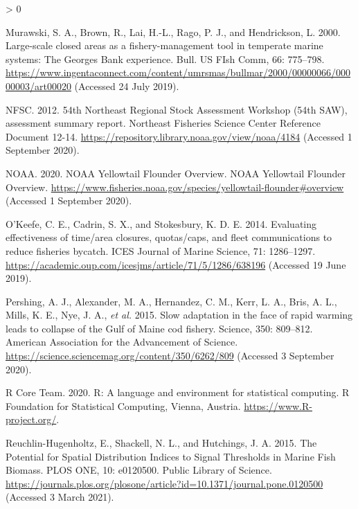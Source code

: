 \documentclass[
]{article}
\newlength{\cslhangindent}
\newenvironment{CSLReferences}[2] %
 {%
  \setlength{\parindent}{0pt}
  \ifodd #1 \everypar{\setlength{\hangindent}{\cslhangindent}}\ignorespaces\fi
  \ifnum #2 > 0
  \setlength{\parskip}{#2\baselineskip}
  \fi
 }%
 {}
\begin{document}
\begin{CSLReferences}{1}{0}
\leavevmode\hypertarget{ref-murawskiLargescaleClosedAreas2000}{}%
Murawski, S. A., Brown, R., Lai, H.-L., Rago, P. J., and Hendrickson, L. 2000. Large-scale closed areas as a fishery-management tool in temperate marine systems: The {Georges Bank} experience. Bull. US FIsh Comm, 66: 775--798. \url{https://www.ingentaconnect.com/content/umrsmas/bullmar/2000/00000066/00000003/art00020} (Accessed 24 July 2019).

\leavevmode\hypertarget{ref-nfsc54thNortheastRegional2012}{}%
NFSC. 2012. 54th {Northeast Regional Stock Assessment Workshop} (54th {SAW}), assessment summary report. Northeast Fisheries Science Center Reference Document 12-14. \url{https://repository.library.noaa.gov/view/noaa/4184} (Accessed 1 September 2020).

\leavevmode\hypertarget{ref-noaaNOAAYellowtailFlounder2020}{}%
NOAA. 2020. {NOAA Yellowtail Flounder Overview}. {NOAA Yellowtail Flounder Overview}. \url{https://www.fisheries.noaa.gov/species/yellowtail-flounder\#overview} (Accessed 1 September 2020).

\leavevmode\hypertarget{ref-okeefeEvaluatingEffectivenessTime2014}{}%
O'Keefe, C. E., Cadrin, S. X., and Stokesbury, K. D. E. 2014. Evaluating effectiveness of time/area closures, quotas/caps, and fleet communications to reduce fisheries bycatch. ICES Journal of Marine Science, 71: 1286--1297. \url{https://academic.oup.com/icesjms/article/71/5/1286/638196} (Accessed 19 June 2019).

\leavevmode\hypertarget{ref-pershingSlowAdaptationFace2015}{}%
Pershing, A. J., Alexander, M. A., Hernandez, C. M., Kerr, L. A., Bris, A. L., Mills, K. E., Nye, J. A., \emph{et al.} 2015. Slow adaptation in the face of rapid warming leads to collapse of the {Gulf} of {Maine} cod fishery. Science, 350: 809--812. {American Association for the Advancement of Science}. \url{https://science.sciencemag.org/content/350/6262/809} (Accessed 3 September 2020).

\leavevmode\hypertarget{ref-rcoreteamLanguageEnvironmentStatistical2020}{}%
R Core Team. 2020. R: {A} language and environment for statistical computing. {R Foundation for Statistical Computing}, {Vienna, Austria}. \url{https://www.R-project.org/}.

\leavevmode\hypertarget{ref-reuchlin-hugenholtzPotentialSpatialDistribution2015}{}%
Reuchlin-Hugenholtz, E., Shackell, N. L., and Hutchings, J. A. 2015. The {Potential} for {Spatial Distribution Indices} to {Signal Thresholds} in {Marine Fish Biomass}. PLOS ONE, 10: e0120500. {Public Library of Science}. \url{https://journals.plos.org/plosone/article?id=10.1371/journal.pone.0120500} (Accessed 3 March 2021).


\end{CSLReferences}
\end{document}
